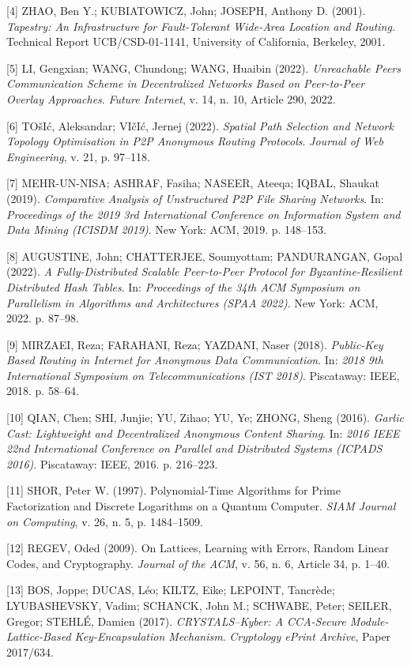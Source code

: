 \documentclass[12pt]{article}
\begin{document}
[4] ZHAO, Ben Y.; KUBIATOWICZ, John; JOSEPH, Anthony D. (2001). 
\textit{Tapestry: An Infrastructure for Fault-Tolerant Wide-Area Location and Routing}. 
Technical Report UCB/CSD-01-1141, University of California, Berkeley, 2001.

[5] LI, Gengxian; WANG, Chundong; WANG, Huaibin (2022).
\textit{Unreachable Peers Communication Scheme in Decentralized Networks Based on Peer-to-Peer Overlay Approaches}.
\textit{Future Internet}, v. 14, n. 10, Article 290, 2022.

[6] TO\v{s}I\'{c}, Aleksandar; VI\v{c}I\'{c}, Jernej (2022).
\textit{Spatial Path Selection and Network Topology Optimisation in P2P Anonymous Routing Protocols}.
\textit{Journal of Web Engineering}, v. 21, p. 97--118.

[7] MEHR-UN-NISA; ASHRAF, Fasiha; NASEER, Ateeqa; IQBAL, Shaukat (2019).
\textit{Comparative Analysis of Unstructured P2P File Sharing Networks}.
In: \textit{Proceedings of the 2019 3rd International Conference on Information System and Data Mining (ICISDM 2019)}.
New York: ACM, 2019. p. 148--153.

[8] AUGUSTINE, John; CHATTERJEE, Soumyottam; PANDURANGAN, Gopal (2022).
\textit{A Fully-Distributed Scalable Peer-to-Peer Protocol for Byzantine-Resilient Distributed Hash Tables}.
In: \textit{Proceedings of the 34th ACM Symposium on Parallelism in Algorithms and Architectures (SPAA 2022)}.
New York: ACM, 2022. p. 87--98.

[9] MIRZAEI, Reza; FARAHANI, Reza; YAZDANI, Naser (2018).
\textit{Public-Key Based Routing in Internet for Anonymous Data Communication}.
In: \textit{2018 9th International Symposium on Telecommunications (IST 2018)}.
Piscataway: IEEE, 2018. p. 58--64.

[10] QIAN, Chen; SHI, Junjie; YU, Zihao; YU, Ye; ZHONG, Sheng (2016).
\textit{Garlic Cast: Lightweight and Decentralized Anonymous Content Sharing}.
In: \textit{2016 IEEE 22nd International Conference on Parallel and Distributed Systems (ICPADS 2016)}.
Piscataway: IEEE, 2016. p. 216--223.

[11] SHOR, Peter W. (1997). Polynomial-Time Algorithms for Prime Factorization and Discrete Logarithms on a Quantum Computer. \textit{SIAM Journal on Computing}, v. 26, n. 5, p. 1484--1509.

[12] REGEV, Oded (2009). On Lattices, Learning with Errors, Random Linear Codes, and Cryptography. \textit{Journal of the ACM}, v. 56, n. 6, Article 34, p. 1--40.

[13] BOS, Joppe; DUCAS, Léo; KILTZ, Eike; LEPOINT, Tancrède; LYUBASHEVSKY, Vadim; SCHANCK, John M.; SCHWABE, Peter; SEILER, Gregor; STEHLÉ, Damien (2017).
\textit{CRYSTALS--Kyber: A CCA-Secure Module-Lattice-Based Key-Encapsulation Mechanism}.
\textit{Cryptology ePrint Archive}, Paper 2017/634.
\end{document}

